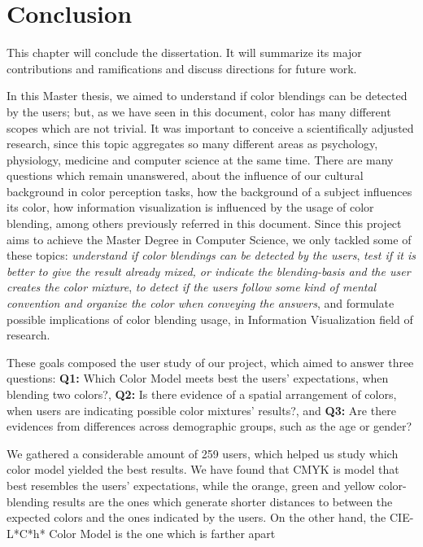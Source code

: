 
\chapter{Conclusion}
\label{chapter:conclusion}
%
This chapter will conclude the dissertation. It will summarize its major contributions and ramifications and discuss directions for future work. \par
%
In this Master thesis, we aimed to understand if color blendings can be detected by the users; but, as we have seen in this document, color has many
different scopes which are not trivial. It was important to conceive a scientifically adjusted research, since this topic aggregates so many different
areas as psychology, physiology, medicine and computer science at the same time. There are many questions which remain unanswered, about the influence
of our cultural background in color perception tasks, how the background of a subject influences its color, how information visualization is influenced
by the usage of color blending, among others previously referred in this document. Since this project aims to achieve the Master Degree in Computer
Science, we only tackled some of these topics: \emph{understand if color blendings can be detected by the users}, \emph{test if it is better to give
the result already mixed, or indicate the blending-basis and the user creates the color mixture}, \emph{to detect if the users follow some kind of
mental convention and organize the color when conveying the answers}, and formulate possible implications of color blending usage, in Information
Visualization field of research. \par
%
These goals composed the user study of our project, which aimed to answer three questions: \textbf{Q1:} Which Color Model meets best the users'
expectations, when blending two colors?, \textbf{Q2:} Is there evidence of a spatial arrangement of colors, when users are indicating possible color
mixtures' results?, and \textbf{Q3:} Are there evidences from differences across demographic groups, such as the age or gender? \par
%
We gathered a considerable amount of 259 users, which helped us study which color model yielded the best results. We have found that CMYK is model that
best resembles the users' expectations, while the orange, green and yellow color-blending results are the ones which generate shorter distances to
between the expected colors and the ones indicated by the users. On the other hand, the CIE-L*C*h* Color Model is the one which is farther apart
